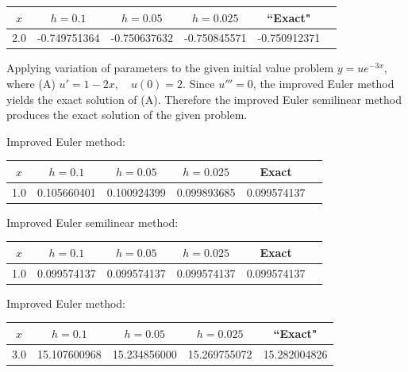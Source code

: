\bigskip

{\small
{}
\begin{tabular}{|c|r|r|r|r|r|}
\hline
\multicolumn{1}{|c|}{$x$}&
\multicolumn{1}{|c|}{$h=0.1$}&
\multicolumn{1}{|c|}{$h=0.05$}&
\multicolumn{1}{|c|}{$h=0.025$}&
\multicolumn{1}{|c|}{``Exact"}\\ \hline
2.0 & -0.749751364 & -0.750637632 & -0.750845571 & -0.750912371 \\
\hline
\end{tabular}}

\bigskip

Applying variation of parameters to the given initial value problem
$y=ue^{-3x}$, where (A) $u'=1-2x,\quad u(0)=2$. Since $u'''=0$,
the improved Euler method yields the exact solution of (A). Therefore
the improved Euler semilinear method produces the exact solution of
the given problem.

\bigskip
{\small Improved Euler method:
\begin{tabular}{|c|r|r|r|r|r|}
\hline
\multicolumn{1}{|c|}{$x$}&
\multicolumn{1}{|c|}{$h=0.1$}&
\multicolumn{1}{|c|}{$h=0.05$}&
\multicolumn{1}{|c|}{$h=0.025$}&
\multicolumn{1}{|c|}{Exact}\\ \hline
1.0 & 0.105660401 & 0.100924399 & 0.099893685 & 0.099574137 \\
\hline
\end{tabular}}

\bigskip
\hspace{.75in}
{\small Improved Euler semilinear method:
\begin{tabular}{|c|r|r|r|r|r|}
\hline
\multicolumn{1}{|c|}{$x$}&
\multicolumn{1}{|c|}{$h=0.1$}&
\multicolumn{1}{|c|}{$h=0.05$}&
\multicolumn{1}{|c|}{$h=0.025$}&
\multicolumn{1}{|c|}{Exact}\\ \hline
1.0 & 0.099574137 & 0.099574137 &0.099574137  &0.099574137  \\
\hline
\end{tabular}}

\bigskip

{\small Improved Euler method:
\begin{tabular}{|c|r|r|r|r|}
\hline
\multicolumn{1}{|c|}{$x$}&
\multicolumn{1}{|c|}{$h=0.1$}&
\multicolumn{1}{|c|}{$h=0.05$}&
\multicolumn{1}{|c|}{$h=0.025$}&
\multicolumn{1}{|c|}{``Exact"}\\ \hline
3.0 & 15.107600968 & 15.234856000 & 15.269755072 & 15.282004826 \\
\hline
\end{tabular}}

